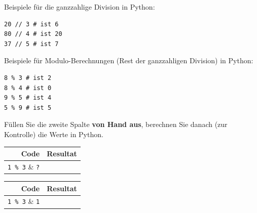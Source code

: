 \begin{myexample}
Beispiele für die ganzzahlige Division in Python:
\begin{lstlisting}
20 // 3 # ist 6
80 // 4 # ist 20
37 // 5 # ist 7
\end{lstlisting}
\end{myexample}

\begin{myexample}
Beispiele für Modulo-Berechnungen (Rest der ganzzahligen Division) in Python:
\begin{lstlisting}
8 % 3 # ist 2
8 % 4 # ist 0
9 % 5 # ist 4
5 % 9 # ist 5
\end{lstlisting}
\end{myexample}

\begin{myexercise}\label{ex:modulo}
	Füllen Sie die zweite Spalte \textbf{von Hand aus}, berechnen Sie danach (zur Kontrolle) die Werte in Python.
	\begin{table}[H]
		\centering
		\begin{tabular}{r|c}
			\textbf{Code}     & \textbf{Resultat} \\\midrule\midrule
			\lstinline|1 % 3| & \lstinline|?|     \\\midrule
			\lstinline|2 % 3| & \lstinline|?|     \\\midrule
			\lstinline|3 % 3| & \lstinline|?|     \\\midrule
			\lstinline|4 % 3| & \lstinline|?|     \\\midrule
			\lstinline|5 % 3| & \lstinline|?|     \\\midrule
			\lstinline|6 % 3| & \lstinline|?|     \\
		\end{tabular}
	\end{table}
	\begin{myanswer}
		\begin{table}[H]
			\centering
			\begin{tabular}{r|c}
				\textbf{Code}     & \textbf{Resultat} \\\midrule\midrule
				\lstinline|1 % 3| & \lstinline|1|     \\\midrule
				\lstinline|2 % 3| & \lstinline|2|     \\\midrule
				\lstinline|3 % 3| & \lstinline|0|     \\\midrule
				\lstinline|4 % 3| & \lstinline|1|     \\\midrule
				\lstinline|5 % 3| & \lstinline|2|     \\\midrule
				\lstinline|6 % 3| & \lstinline|0|     \\
			\end{tabular}
		\end{table}
	\end{myanswer}
\end{myexercise}


